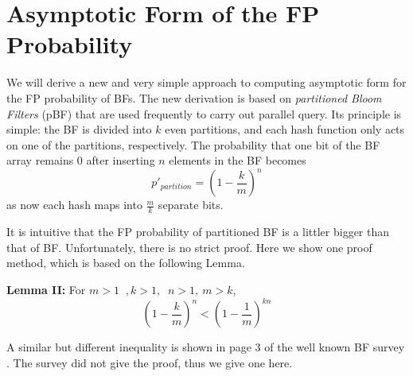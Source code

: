 \section{Asymptotic Form of the FP Probability}
\label{sec:limitf}
We will derive a new and very simple approach to computing asymptotic form for the FP probability of BFs. The new derivation is based on \textit{partitioned Bloom Filters} (pBF) that are used frequently to carry out parallel query. Its principle is simple: the BF is divided into $k$ even partitions, and each hash function only acts on one of the partitions, respectively. %
The probability that one bit of the BF array remains 0 after inserting $n$ elements in the BF becomes
\begin{equation}
p'_{partition} = \left( 1-\dfrac{k}{m} \right)^n
\label{equ:p'pBF}
\end{equation}
as now each hash maps into $\frac{m}{k}$ separate bits.

It is intuitive that the FP probability of partitioned BF is a littler bigger than that of BF. Unfortunately, there is no strict proof. Here we show one proof method, which is based on the following Lemma. 

\textbf{Lemma II:} For $m > 1 \;\;,   k >1, \;\; n > 1, \: m>k$,
\begin{equation}
\label{theorem1}
\left( 1-\dfrac{k}{m} \right)  ^n <
\left( 1-\dfrac{1}{m} \right)  ^{kn}
\end{equation}

A similar but different inequality is shown in page 3 of the well known BF survey \cite{BFSurvey}. The survey did not give the proof, thus we give one here.

